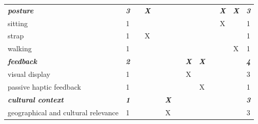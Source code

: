 \documentclass[letterpaper, 12pt]{article}
\begin{document}
\begin{spacing}{1.1}
\begin{longtable}{L{5.3cm}cccccccccccc}
        \emph{\textbf{posture}} & \emph{\textbf{3}} & & \emph{\textbf{X}} & & & & & & & \emph{\textbf{X}} & \emph{\textbf{X}} & \emph{\textbf{3}} \\
        sitting                          & 1  &   &   &   &   &   &   &   &   & X &   & 1  \\
        strap                            & 1  &   & X &   &   &   &   &   &   &   &   & 1  \\
        walking                          & 1  &   &   &   &   &   &   &   &   &   & X & 1  \\
        \hline
    
        \emph{\textbf{feedback}} & \emph{\textbf{2}} & & & & & & \emph{\textbf{X}} & \emph{\textbf{X}} &   &   &   & \emph{\textbf{4}}  \\
        visual display                   & 1  &   &   &   &   &   & X &   &   &   &   & 3  \\
        passive haptic feedback          & 1  &   &   &   &   &   &   & X &   &   &   & 1  \\
        \hline

        \emph{\textbf{cultural context}} & \emph{\textbf{1}} & & & & \emph{\textbf{X}} & & & & & & & \emph{\textbf{3}} \\
        geographical and cultural relevance  & 1  &   &   &   & X &   &   &   &   &   &   & 3  \\
        \hline
    \end{longtable}
\end{spacing}
\end{document}

